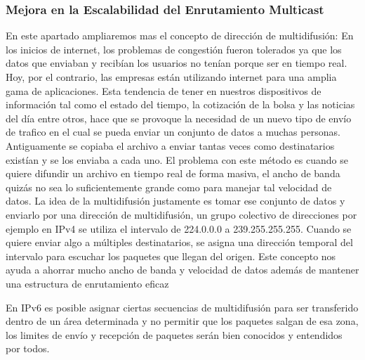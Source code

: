 \documentclass[11pt,a4paper]{article}
\begin{document}
\subsubsection{Mejora en la Escalabilidad del Enrutamiento Multicast}
En este apartado ampliaremos mas el concepto de dirección de multidifusión: En los inicios de 
internet, los problemas de congestión fueron tolerados ya que los datos que enviaban y recibían los 
usuarios no tenían porque ser en tiempo real. Hoy, por el contrario, las empresas están utilizando 
internet para una amplia gama de aplicaciones. Esta tendencia de tener en nuestros dispositivos de 
información tal como el estado del tiempo, la cotización de la bolsa y las noticias del día entre 
otros, hace que se provoque la necesidad de un nuevo tipo de envío de trafico en el cual se pueda 
enviar un conjunto de datos a muchas personas. Antiguamente se copiaba el archivo a enviar tantas 
veces como destinatarios existían y se los enviaba a cada uno. El problema con este método es cuando 
se quiere difundir un archivo en tiempo real de forma masiva, el ancho de banda quizás no sea lo 
suficientemente grande como para manejar tal velocidad de datos. La idea de la multidifusión 
justamente es tomar ese conjunto de datos y enviarlo por una dirección de multidifusión, un grupo 
colectivo de direcciones por ejemplo en IPv4 se utiliza el intervalo de 224.0.0.0 a 239.255.255.255. 
Cuando se quiere enviar algo a múltiples destinatarios, se asigna una dirección temporal del 
intervalo para escuchar los paquetes que llegan del origen. Este concepto nos ayuda a ahorrar mucho 
ancho de banda y velocidad de datos además de mantener una estructura de enrutamiento eficaz \par
En IPv6 es posible asignar ciertas secuencias de multidifusión para ser transferido dentro de un 
área determinada y no permitir que los paquetes salgan de esa zona, los limites de envío y recepción 
de paquetes serán bien conocidos y entendidos por todos.
\end{document}
